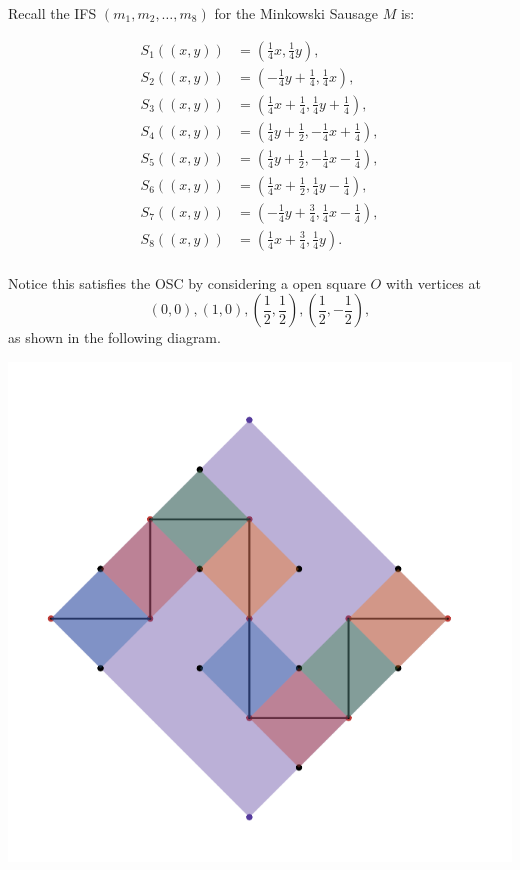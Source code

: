 Recall the IFS \((m_1, m_2, \ldots, m_8)\) for the Minkowski Sausage \(M\) is:

\begin{align*}
    S_1((x, y)) &= \left(\frac{1}{4}x, \frac{1}{4}y\right),\\
    S_2((x, y)) &= \left(-\frac{1}{4}y + \frac{1}{4}, \frac{1}{4}x\right),\\
    S_3((x, y)) &= \left(\frac{1}{4}x + \frac{1}{4}, \frac{1}{4}y + \frac{1}{4}\right),\\
    S_4((x, y)) &= \left(\frac{1}{4}y + \frac{1}{2}, -\frac{1}{4}x + \frac{1}{4}\right),\\
    S_5((x, y)) &= \left(\frac{1}{4}y + \frac{1}{2}, -\frac{1}{4}x - \frac{1}{4}\right),\\
    S_6((x, y)) &= \left(\frac{1}{4}x + \frac{1}{2}, \frac{1}{4}y - \frac{1}{4}\right),\\
    S_7((x, y)) &= \left(-\frac{1}{4}y + \frac{3}{4}, \frac{1}{4}x - \frac{1}{4}\right),\\
    S_8((x, y)) &= \left(\frac{1}{4}x + \frac{3}{4}, \frac{1}{4}y\right).\\
\end{align*}

Notice this satisfies the OSC by considering a open square \(O\) with vertices at
\[(0, 0), (1, 0), \left(\frac{1}{2}, \frac{1}{2}\right), \left(\frac{1}{2}, -\frac{1}{2}\right),\] as shown in the following diagram.

\begin{center}
    \includegraphics[scale=0.3]{solutions/section-5-0/diag-5-0-5-1.png}
\end{center}

